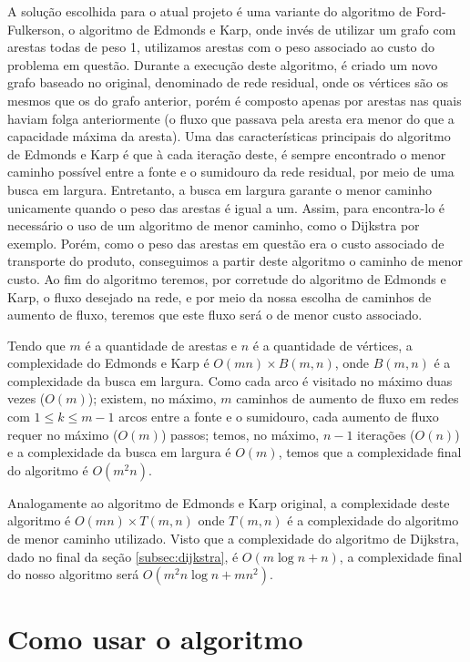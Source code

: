 \documentclass[12pt, a4]{article}
\begin{document}
A solução escolhida para o atual projeto é uma variante do algoritmo de
Ford-Fulkerson, o algoritmo de Edmonds e Karp, onde invés de utilizar um grafo
com arestas todas de peso 1, utilizamos arestas com o peso associado ao custo do
problema em questão. Durante a execução deste algoritmo, é criado um novo grafo
baseado no original, denominado de rede residual, onde os vértices são os mesmos
que os do grafo anterior, porém é composto apenas por arestas nas quais haviam
folga anteriormente (o fluxo que passava pela aresta era menor do que a
capacidade máxima da aresta). Uma das características principais do algoritmo de
Edmonds e Karp é que à cada iteração deste, é sempre encontrado o menor caminho
possível entre a fonte e o sumidouro da rede residual, por meio de uma busca em
largura. Entretanto, a busca em largura garante o menor caminho unicamente
quando o peso das arestas é igual a um. Assim, para encontra-lo é necessário o
uso de um algoritmo de menor caminho, como o Dijkstra por exemplo. Porém, como o
peso das arestas em questão era o custo associado de transporte do produto,
conseguimos a partir deste algoritmo o caminho de menor custo. Ao fim do
algoritmo teremos, por corretude do algoritmo de Edmonds e Karp, o fluxo
desejado na rede, e por meio da nossa escolha de caminhos de aumento de fluxo,
teremos que este fluxo será o de menor custo associado.

Tendo que $m$ é a quantidade de arestas e $n$ é a quantidade de vértices, a
complexidade do Edmonds e Karp é $O(mn) \times B(m,n)$, onde $B(m,n)$ é a
complexidade da busca em largura. Como cada arco é visitado no máximo duas vezes
($O(m)$); existem, no máximo, $m$ caminhos de aumento de fluxo em redes com
$1 \leq k \leq m-1$ arcos entre a fonte e o sumidouro, cada aumento de fluxo
requer no máximo ($O(m)$) passos; temos, no máximo, $n-1$ iterações ($O(n)$) e a
complexidade da busca em largura é $O(m)$, temos que a complexidade final do
algoritmo é $O(m^2 n)$.

Analogamente ao algoritmo de Edmonds e Karp original, a complexidade deste
algoritmo é $O(mn) \times T(m,n)$ onde $T(m,n)$ é a complexidade do algoritmo de
menor caminho utilizado. Visto que a complexidade do algoritmo de Dijkstra, dado
no final da seção \ref{subsec:dijkstra}, é $O(m \log n + n)$, a complexidade
final do nosso algoritmo será $O(m^2 n \log n + m n^2)$.

\section{Como usar o algoritmo}
\label{sec:usage}
\end{document}
